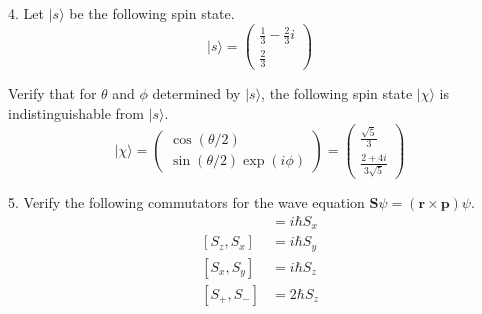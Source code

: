4. Let $|s\rangle$ be the following spin state.
\begin{equation*}
|s\rangle=\begin{pmatrix}\frac{1}{3}-\frac{2}{3}i\\[1ex]\frac{2}{3}\end{pmatrix}
\end{equation*}

Verify that for $\theta$ and $\phi$ determined by $|s\rangle$,
the following spin state $|\chi\rangle$ is indistinguishable from $|s\rangle$.
\begin{equation*}
|\chi\rangle
=\begin{pmatrix}\cos(\theta/2)\\\sin(\theta/2)\exp(i\phi)\end{pmatrix}
=\begin{pmatrix}\frac{\sqrt5}{3}\\[1ex]\frac{2+4i}{3\sqrt5}\end{pmatrix}
\end{equation*}

5. Verify the following commutators for the wave equation
$\mathbf S\psi=(\mathbf r\times\mathbf p)\psi$.
\begin{align*}
[S_y,S_z]&=i\hbar S_x
\\
[S_z,S_x]&=i\hbar S_y
\\
[S_x,S_y]&=i\hbar S_z
\\[1ex]
[S_+,S_-]&=2\hbar S_z
\end{align*}


